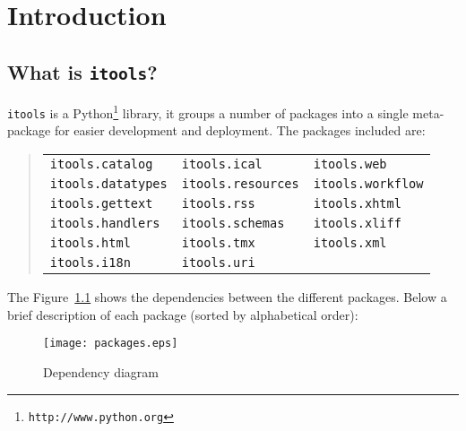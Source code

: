 \chapter{Introduction}

\section{What is {\tt itools}?}

{\tt itools} is a Python\footnote{\tt http://www.python.org} library, it
groups a number of packages into a single meta-package for easier
development and deployment. The packages included are:

\begin{quote}
\begin{tabular}{lll}
  {\tt itools.catalog} & {\tt itools.ical} & {\tt itools.web} \\
  {\tt itools.datatypes} & {\tt itools.resources} & {\tt itools.workflow} \\
  {\tt itools.gettext} & {\tt itools.rss} & {\tt itools.xhtml} \\
  {\tt itools.handlers} & {\tt itools.schemas} & {\tt itools.xliff} \\
  {\tt itools.html} & {\tt itools.tmx} & {\tt itools.xml} \\
  {\tt itools.i18n} & {\tt itools.uri} & \\
\end{tabular}
\end{quote}

The Figure~\ref{Figure: packages} shows the dependencies between the
different packages. Below a brief description of each package (sorted
by alphabetical order):

\begin{figure}
  \center
  \texttt{[image: packages.eps]}
  \caption{Dependency diagram}
  \label{Figure: packages}
\end{figure}

